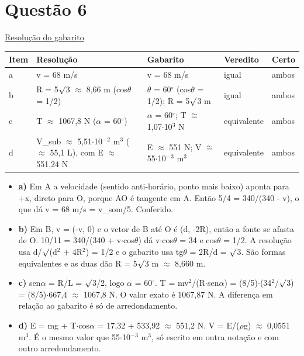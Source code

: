 \documentclass{article}%
\begin{document}
\section*{Questão 6}%
\href{https://poliedroresolve.sistemapoliedro.com.br/vestibulares/ime/2027/ime-2-fase-dia-2-27-10-2026-2-fase-dia-2/dissertativa-6-fisica-2-fase-dia-2-ime-2027}{Resolução do gabarito}\par\smallskip%
\begin{longtable}{@{}p{} p{} p{} p{} p{}@{}}\toprule Item & Resolução & Gabarito & Veredito & Certo \\ \midrule
a & v = 68 m/s & v = 68 m/s & igual & ambos \\
b & R = 5$\surd$3 $\approx$ 8,66 m (cos$\theta$ = 1/2) & $\theta$ = 60$^\circ$ (cos$\theta$ = 1/2); R = 5$\surd$3 m & igual & ambos \\
c & T $\approx$ 1067,8 N ($\alpha$ = 60$^\circ$) & $\alpha$ = 60$^\circ$; T $\cong$ 1,07$\cdot$10$^3$ N & equivalente & ambos \\
d & V\_sub $\approx$ 5,51$\cdot$10$^{-}$$^2$ m$^3$ ($\approx$ 55,1 L), com E $\approx$ 551,24 N & E $\approx$ 551 N; V $\cong$ 55$\cdot$10$^{-}$$^3$ m$^3$ & equivalente & ambos \\
\bottomrule\end{longtable}%
\begin{itemize}%
\item%
\textbf{a)} Em A a velocidade (sentido anti{-}horário, ponto mais baixo) aponta para +x, direto para O, porque AO é tangente em A. Então 5/4 = 340/(340 - v), o que dá v = 68 m/s = v\_som/5. Conferido.%
\item%
\textbf{b)} Em B, v = (-v, 0) e o vetor de B até O é (d, -2R), então a fonte se afasta de O. 10/11 = 340/(340 + v$\cdot$cos$\theta$) dá v$\cdot$cos$\theta$ = 34 e cos$\theta$ = 1/2. A resolução usa d/$\surd$(d$^2$ + 4R$^2$) = 1/2 e o gabarito usa tg$\theta$ = 2R/d = $\surd$3. São formas equivalentes e as duas dão R = 5$\surd$3 m $\approx$ 8,660 m.%
\item%
\textbf{c)} sen$\alpha$ = R/L = $\surd$3/2, logo $\alpha$ = 60$^\circ$. T = mv$^2$/(R$\cdot$sen$\alpha$) = (8/5)$\cdot$(34$^2$/$\surd$3) = (8/5)$\cdot$667,4 $\approx$ 1067,8 N. O valor exato é 1067,87 N. A diferença em relação ao gabarito é só de arredondamento.%
\item%
\textbf{d)} E = mg + T$\cdot$cos$\alpha$ = 17,32 + 533,92 $\approx$ 551,2 N. V = E/($\rho$g) $\approx$ 0,0551 m$^3$. É o mesmo valor que 55$\cdot$10$^{-}$$^3$ m$^3$, só escrito em outra notação e com outro arredondamento.%
\end{itemize}%
\end{document}
